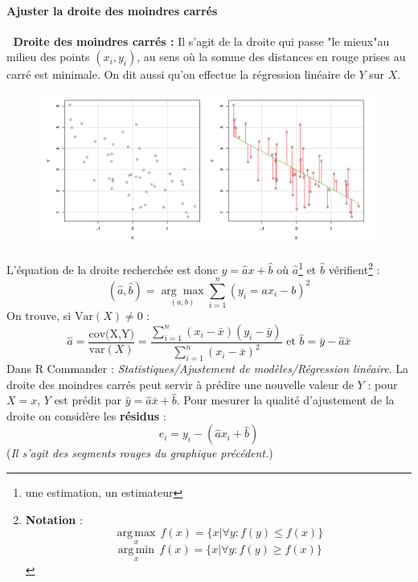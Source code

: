 \paragraph{Ajuster la droite des moindres carrés} \textcolor{white}{.}\newline
\textbf{Droite des moindres carrés :} Il s'agit de la droite qui passe "le mieux"au milieu des points $(x_{i},y_{i})$, au sens où la somme des distances en rouge prises au carré est minimale. On dit aussi qu'on effectue la régression linéaire de $Y$ sur $X$.
\begin{figure}[H]\begin{center}\includegraphics[scale=0.5]{ilu/ccm20.png}\end{center}\end{figure}
L'équation de la droite recherchée est donc $y = \hat{a}x + \hat{b}$ où $\hat{a}$\footnote{une estimation, un estimateur} et $\hat{b}$ vérifient\footnote{
  \textbf{Notation} : 
  $$\underset{x}{\operatorname{arg\,max}} \, f(x) = \{x | \forall y : f(y) \leq f(x)\}$$
  $$\underset{x}{\operatorname{arg\,min}} \, f(x) = \{x | \forall y : f(y) \geq f(x)\}$$
} : 
$$(\hat{a},\hat{b}) = \underset{(a,b)}{\arg\max} \sum_{i=1}^{n} (y_{i} = ax_{i} - b)^{2}$$
On trouve, si $\textrm{Var}(X) \neq 0$ : 
$$\hat{a} = \frac{\textrm{cov(X,Y)}}{\textrm{var}(X)} = \frac{\sum_{i=1}^{n}(x_{i}-\bar{x})(y_{i}-\bar{y})}{\sum_{i=1}^{n}(x_{i}-\bar{x})^{2}} \textrm{ et } \hat{b} = \bar{y}-\hat{a}\bar{x}$$
Dans R Commander : \textit{Statistiques/Ajustement de modèles/Régression linéaire}.\newline
La droite des moindres carrés peut servir à prédire une nouvelle valeur de $Y$ : pour $X = x$, $Y$ est prédit par $\hat{y} = \hat{a}\bar{x}+\hat{b}$.\newline
Pour mesurer la qualité d'ajustement de la droite on considère les \textbf{résidus} :
$$e_{i} = y_{i} - (\hat{a}x_{i} + \hat{b})$$ 
(\textit{Il s'agit des segments rouges du graphique précédent.})\newline
